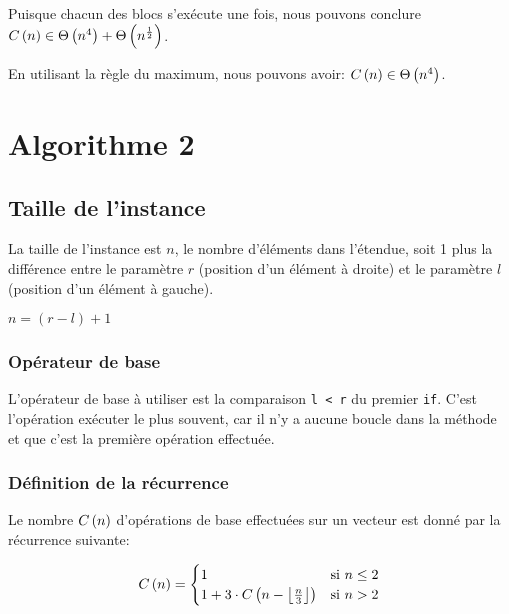 \documentclass[class=article]{standalone}
\begin{document}
Puisque chacun des blocs s'exécute une fois, nous pouvons conclure
$C\left ( n \right ) \in \Theta\left ( n^4 \right ) + \Theta\left ( n^{\frac{1}{2}} \right )$.

En utilisant la règle du maximum, nous pouvons avoir:
$C\left ( n \right ) \in \Theta\left ( n^4 \right )$.

\pagebreak

\section*{Algorithme 2}
\subsection*{Taille de l'instance}
La taille de l'instance est $n$, le nombre d'éléments dans l'étendue, 
soit 1 plus la différence entre 
le paramètre $r$ (position d'un élément à droite) et 
le paramètre $l$ (position d'un élément à gauche).

$n = (r - l) + 1$

\subsubsection*{Opérateur de base}
L'opérateur de base à utiliser est la comparaison \lstinline{l < r} du premier \lstinline{if}.
C'est l'opération exécuter le plus souvent, car il n'y a aucune boucle dans la méthode et que
c'est la première opération effectuée.

\subsubsection*{Définition de la récurrence}

Le nombre $C\left ( n \right )$ d'opérations de base effectuées sur un vecteur est donné par la récurrence suivante:

\[
  C\left ( n \right ) =
  \begin{cases}
    1 & \text{si } n \leq 2 \\
    1 + 3 \cdot C\left ( n-\left \lfloor \frac{n}{3} \right \rfloor \right ) & \text{si } n > 2 \\
  \end{cases}
\]
\end{document}
